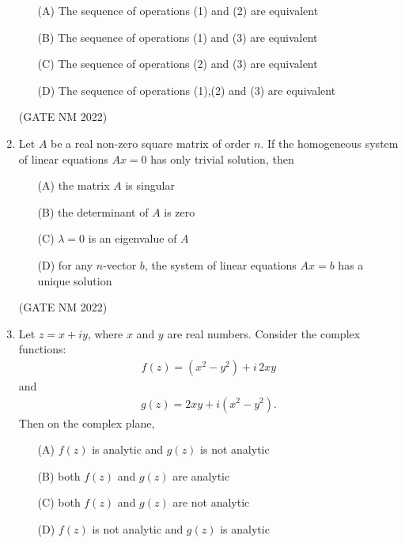 \documentclass[journal,12pt,onecolumn]{IEEEtran}
\theoremstyle{remark}
\begin{document}
\begin{enumerate}
\begin{enumerate}
    \item[(A)] The sequence of operations (1) and (2) are equivalent
    \item[(B)] The sequence of operations (1) and (3) are equivalent
    \item[(C)] The sequence of operations (2) and (3) are equivalent
    \item[(D)] The sequence of operations (1),(2) and (3) are equivalent
\end{enumerate}

\hfill(GATE NM 2022)








\item  Let $A$ be a real non-zero square matrix of order $n$. If the homogeneous system of linear equations $A x = 0$ has only trivial solution, then

\begin{enumerate}
    \item[(A)] the matrix $A$ is singular
    \item[(B)] the determinant of $A$ is zero
    \item[(C)] $\lambda = 0$ is an eigenvalue of $A$
    \item[(D)] for any $n$-vector $b$, the system of linear equations $A x = b$ has a unique solution
\end{enumerate}

\hfill(GATE NM 2022)






\item  Let $z = x + i y$, where $x$ and $y$ are real numbers. Consider the complex functions:
\begin{align*}
f(z) = (x^2 - y^2) + i\,  2xy
\end{align*}
and
\begin{align*}
g(z) = 2xy + i (x^2 - y^2).
\end{align*}
Then on the complex plane,
\begin{enumerate}
    \item[(A)] $f(z)$ is analytic and $g(z)$ is not analytic
    \item[(B)] both $f(z)$ and $g(z)$ are analytic
    \item[(C)] both $f(z)$ and $g(z)$ are not analytic
    \item[(D)] $f(z)$ is not analytic and $g(z)$ is analytic
\end{enumerate}


\end{enumerate}
\end{document}
